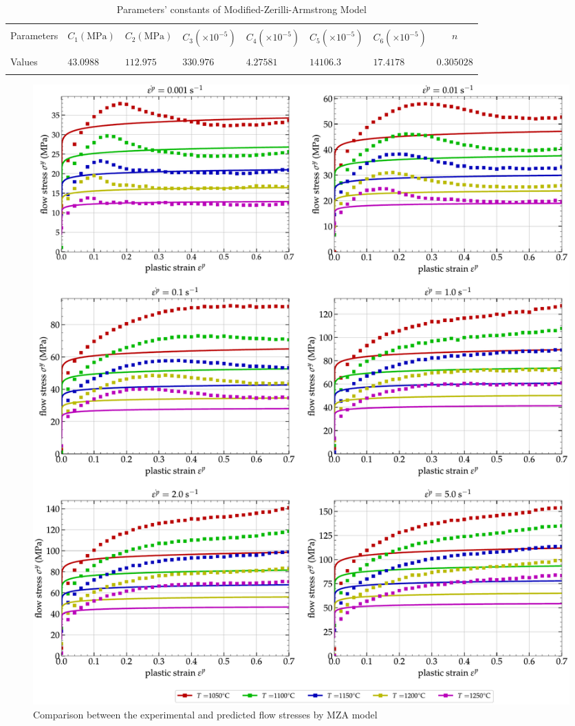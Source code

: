 \documentclass[twoside,english,1p,final,sort&compress]{elsarticle}
\theoremstyle{plain}
\begin{document}
\begin{table}[h!]
\centering{}
\caption{Parameters' constants of Modified-Zerilli-Armstrong Model}
\begin{tabular}{lllllllc}
\hline
&         &             &		   &		 &			   &&\\
Parameters&$C_1(\text{MPa})$    &$C_2(\text{MPa})$        & $C_3(\times10^{-5})$     & $C_4(\times10^{-5})$   & $C_5(\times10^{-5})$       &$C_6(\times10^{-5})$&$n$\\
&         &             &		   &	     &	           &&\\
\hline
Values&$43.0988$&$112.975$& $330.976$&$4.27581$&$14106.3$&$17.4178$&$0.305028$\\
\hline
\label{tab: MZAparameters}
\end{tabular}
\end{table}
\begin{figure}[!ht]
\centering
\includegraphics[width=1.02\columnwidth]
{Figures/CompExpMZA}
\caption{Comparison between the experimental and predicted flow stresses by MZA model}
\label{fig:iCorrelationMZA}
\end{figure}
\FloatBarrier
\end{document}
